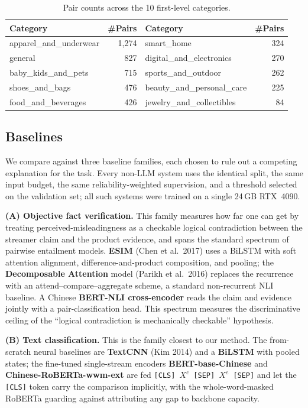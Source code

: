 \documentclass[11pt]{article}
\begin{document}
\begin{table}[t]
\centering\small
\setlength{\tabcolsep}{8pt}
\begin{tabular}{lr@{\hskip 24pt}lr}
\toprule
\textbf{Category} & \textbf{\#Pairs} & \textbf{Category} & \textbf{\#Pairs} \\
\midrule
apparel\_and\_underwear & 1{,}274 & smart\_home              & 324 \\
general                 & 827     & digital\_and\_electronics & 270 \\
baby\_kids\_and\_pets   & 715     & sports\_and\_outdoor     & 262 \\
shoes\_and\_bags        & 476     & beauty\_and\_personal\_care & 225 \\
food\_and\_beverages    & 426     & jewelry\_and\_collectibles & 84 \\
\bottomrule
\end{tabular}
\caption{Pair counts across the 10 first-level categories.}
\label{tab:cat}
\end{table}

\subsection{Baselines}
\label{sec:exp:base}

We compare against three baseline families, each chosen to rule out a competing
explanation for the task. Every non-LLM system uses the identical split, the
same input budget, the same reliability-weighted supervision, and a threshold
selected on the validation set; all such systems were trained on a single
24\,GB RTX~4090.

\textbf{(A) Objective fact verification.} This family measures how far one can
get by treating perceived-misleadingness as a checkable logical contradiction
between the streamer claim and the product evidence, and spans the standard
spectrum of pairwise entailment models. \textbf{ESIM} (Chen et al.\ 2017) uses a
BiLSTM with soft attention alignment, difference-and-product composition, and
pooling; the \textbf{Decomposable Attention} model (Parikh et al.\ 2016) replaces
the recurrence with an attend--compare--aggregate scheme, a standard
non-recurrent NLI baseline. A Chinese \textbf{BERT-NLI cross-encoder} reads the
claim and evidence jointly with a pair-classification head. This spectrum
measures the discriminative ceiling of the ``logical contradiction is
mechanically checkable'' hypothesis.

\textbf{(B) Text classification.} This is the family closest to our method. The
from-scratch neural baselines are \textbf{TextCNN} (Kim 2014) and a
\textbf{BiLSTM} with pooled states; the fine-tuned single-stream encoders
\textbf{BERT-base-Chinese} and \textbf{Chinese-RoBERTa-wwm-ext} are fed
\texttt{[CLS]\,$X^{c}$\,[SEP]\,$X^{e}$\,[SEP]} and let the \texttt{[CLS]} token
carry the comparison implicitly, with the whole-word-masked RoBERTa guarding
against attributing any gap to backbone capacity.
\end{document}
